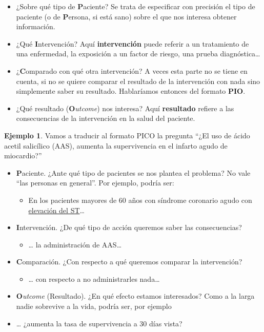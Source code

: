 \documentclass[
]{book}
\providecommand{\tightlist}{%
  \setlength{\itemsep}{0pt}\setlength{\parskip}{0pt}}
\theoremstyle{definition}
\theoremstyle{definition}
\newtheorem{example}{Ejemplo}[chapter]
\theoremstyle{definition}
\theoremstyle{definition}
\theoremstyle{remark}
\begin{document}
\begin{itemize}
\item
  ¿Sobre qué tipo de \textbf{P}aciente? Se trata de especificar con precisión el tipo de paciente (o de \textbf{P}ersona, si está sano) sobre el que nos interesa obtener información.
\item
  ¿Qué \textbf{I}ntervención? Aquí \textbf{intervención} puede referir a un tratamiento de una enfermedad, la exposición a un factor de riesgo, una prueba diagnóstica\ldots{}
\item
  ¿\textbf{C}omparado con qué otra intervención? A veces esta parte no se tiene en cuenta, si no se quiere comparar el resultado de la intervención con nada sino simplemente saber su resultado. Hablaríamos entonces del formato \textbf{PIO}.
\item
  ¿Qué resultado (\textbf{O}\emph{utcome}) nos interesa? Aquí \textbf{resultado} refiere a las consecuencias de la intervención en la salud del paciente.
\end{itemize}

\begin{example}
\protect\hypertarget{exm:unnamed-chunk-55}{}\label{exm:unnamed-chunk-55}Vamos a traducir al formato PICO la pregunta ``¿El uso de ácido acetil salicílico (AAS), aumenta la supervivencia en el infarto agudo de miocardio?''
\end{example}

\begin{itemize}
\item
  \textbf{P}aciente. ¿Ante qué tipo de pacientes se nos plantea el problema? No vale ``las personas en general''. Por ejemplo, podría ser:

  \begin{itemize}
  \tightlist
  \item
    En los pacientes mayores de 60 años con síndrome coronario agudo con \href{http://www.medintensiva.org/es/significado-clinico-del-sindrome-coronario/articulo/S0210569111000866/}{elevación del ST}\ldots{}
  \end{itemize}
\item
  \textbf{I}ntervención. ¿De qué tipo de acción queremos saber las consecuencias?

  \begin{itemize}
  \tightlist
  \item
    \ldots{} la administración de AAS\ldots{}
  \end{itemize}
\item
  \textbf{C}omparación. ¿Con respecto a qué queremos comparar la intervención?

  \begin{itemize}
  \tightlist
  \item
    \ldots{} con respecto a no administrarles nada\ldots{}
  \end{itemize}
\item
  \textbf{O}\emph{utcome} (Resultado). ¿En qué efecto estamos interesados? Como a la larga nadie sobrevive a la vida, podría ser, por ejemplo
\item
  \ldots{} ¿aumenta la tasa de supervivencia a 30 días vista?
\end{itemize}
\end{document}
